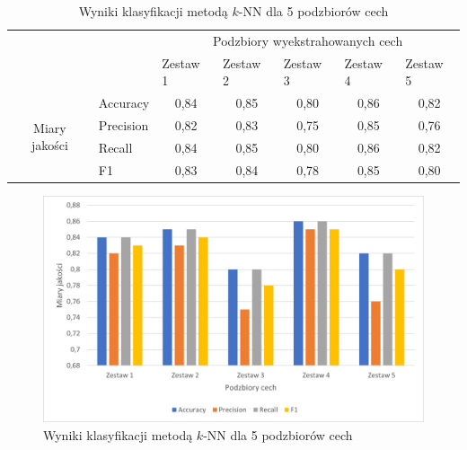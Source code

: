 \documentclass{classrep}
\begin{document}
\begin{table}[!htbp]
\caption{Wyniki klasyfikacji metodą $k$-NN dla 5 podzbiorów cech}
\centering
\label{table:podzbiory}
\begin{tabular}{cl|c|c|c|c|c|}
\cline{3-7}
\multicolumn{1}{l}{}                                 &           & \multicolumn{5}{c|}{Podzbiory wyekstrahowanych cech}                                                                                                          \\ \cline{3-7} 
\multicolumn{1}{l}{}                                 &           & \multicolumn{1}{l|}{Zestaw 1} & \multicolumn{1}{l|}{Zestaw 2} & \multicolumn{1}{l|}{Zestaw 3} & \multicolumn{1}{l|}{Zestaw 4} & \multicolumn{1}{l|}{Zestaw 5} \\ \hline
\multicolumn{1}{|c|}{\multirow{4}{*}{Miary jakości}} & Accuracy  & 0,84                          & 0,85                          & 0,80                          & 0,86                          & 0,82                          \\ \cline{2-7} 
\multicolumn{1}{|c|}{}                               & Precision & 0,82                          & 0,83                          & 0,75                          & 0,85                          & 0,76                          \\ \cline{2-7} 
\multicolumn{1}{|c|}{}                               & Recall    & 0,84                          & 0,85                          & 0,80                          & 0,86                          & 0,82                          \\ \cline{2-7} 
\multicolumn{1}{|c|}{}                               & F1        & 0,83                          & 0,84                          & 0,78                          & 0,85                          & 0,80                          \\ \hline
\end{tabular}
\end{table}
\begin{figure}[H]
    \centering
    \includegraphics[width=14cm]{features_sets_bar_chart.png}
    \caption{Wyniki klasyfikacji metodą $k$-NN dla 5 podzbiorów cech}
    \label{rysunek:podzbiory}
\end{figure}
\end{document}
